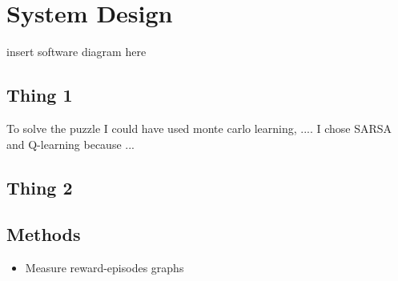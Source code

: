 \graphicspath{{System\_Design/fig}}
\chapter{System Design}
\label{chap:System_Design}

insert software diagram here

\section{Thing 1}
To solve the puzzle I could have used monte carlo learning, ....
I chose SARSA and Q-learning because ...
\section{Thing 2}

\section{Methods}
\begin{itemize}
	\item Measure reward-episodes graphs
\end{itemize}